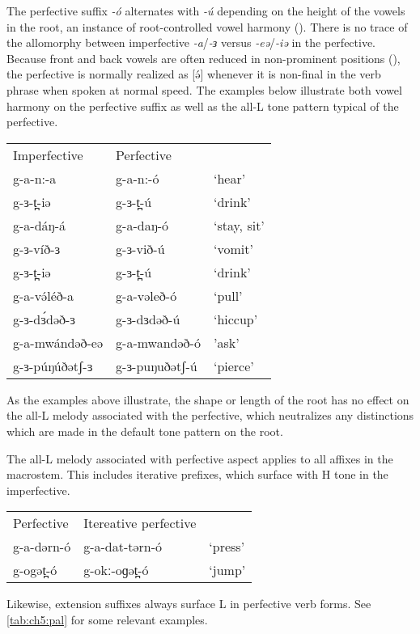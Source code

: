 The perfective suffix \textit{-ó} alternates with \textit{-ú} depending on the height of the vowels in the root, an instance of root-controlled vowel harmony (). There is no trace of the allomorphy between imperfective \textit{-a}/\textit{-ɜ} versus \textit{-eə}/\textit{-iə} in the perfective. Because front and back vowels are often reduced in non-prominent positions (), the perfective is normally realized as [ə́] whenever it is non-final in the verb phrase when spoken at normal speed. The examples below illustrate both vowel harmony on the perfective suffix as well as the all-L tone pattern typical of the perfective.
\ea \begin{tabular}[t]{lll}
Imperfective & Perfective & \\
g-a-n:-a	&	 g-a-n:-ó  & ‘hear’\\
g-ɜ-t̪-iə	&	g-ɜ-t̪-ú & ‘drink’\\
g-a-dáŋ-á & g-a-daŋ-ó & `stay, sit' \\
g-ɜ-víð-ɜ & 	g-ɜ-við-ú	&	`vomit’\\
g-ɜ-t̪-iə	&	g-ɜ-t̪-ú & ‘drink’\\
g-a-və́léð-a &  g-a-vəleð-ó  & ‘pull’ \\
g-ɜ-dɜ́dəð-ɜ	& g-ɜ-dɜdəð-ú	& `hiccup' \\
g-a-mwándəð-eə	& g-a-mwandəð-ó &  'ask'\\
g-ɜ-púŋúðətʃ-ɜ	&  g-ɜ-puŋuðətʃ-ú & 	`pierce' \\
\end{tabular}
\z 
As the examples above illustrate, the shape or length of the root has no effect on the all-L melody associated with the perfective, which neutralizes any distinctions which are made in the default tone pattern on the root. 

The all-L melody associated with perfective aspect applies to all affixes in the macrostem. This includes iterative prefixes, which surface with H tone in the imperfective. 

\ea \begin{tabular}[t]{lll}
Perfective & Itereative perfective & \\
g-a-dərn-ó	&	g-a-dat-tərn-ó	&	‘press’\\
g-ogət̪-ó	&	g-okː-oɡət̪-ó	&	‘jump’\\ 	
\end{tabular}
\z  
Likewise, extension suffixes always surface L in perfective verb forms. See \ref{tab:ch5:pal} for some relevant examples.

